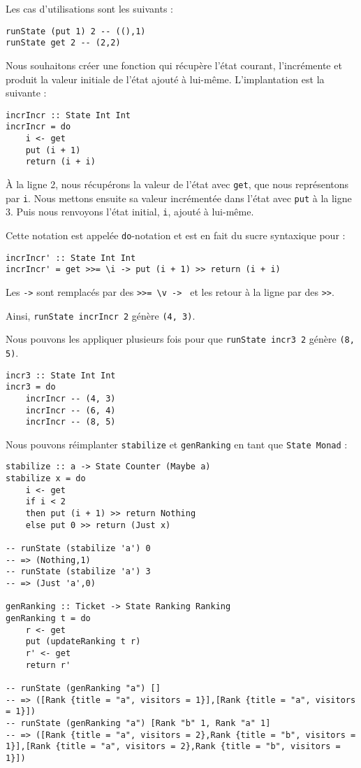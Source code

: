 \documentclass{llncs}
\begin{document}
Les cas d'utilisations sont les suivants :
\begin{lstlisting}
runState (put 1) 2 -- ((),1)
runState get 2 -- (2,2)
\end{lstlisting}

Nous souhaitons créer une fonction qui récupère l'état courant,
l'incrémente et produit la valeur initiale de l'état ajouté à lui-même.
L'implantation est la suivante :
\begin{lstlisting}
incrIncr :: State Int Int
incrIncr = do
    i <- get
    put (i + 1)
    return (i + i)
\end{lstlisting}
À la ligne 2, nous récupérons la valeur de l'état avec \lstinline{get}, que nous
représentons par \lstinline{i}.
Nous mettons ensuite sa valeur incrémentée dans l'état avec \lstinline{put} à la
ligne 3.
Puis nous renvoyons l'état initial, \lstinline{i}, ajouté à lui-même.

Cette notation est appelée \lstinline{do}-notation et est en fait du sucre syntaxique
pour :
\begin{lstlisting}
incrIncr' :: State Int Int
incrIncr' = get >>= \i -> put (i + 1) >> return (i + i)
\end{lstlisting}
Les \lstinline{->} sont remplacés par des \lstinline{>>= \v -> } et les retour à
la ligne par des \lstinline{>>}.

Ainsi, \lstinline{runState incrIncr 2} génère \lstinline{(4, 3)}.

Nous pouvons les appliquer plusieurs fois pour que \lstinline{runState incr3 2} génère \lstinline{(8, 5)}.
\begin{lstlisting}
incr3 :: State Int Int
incr3 = do
    incrIncr -- (4, 3)
    incrIncr -- (6, 4)
    incrIncr -- (8, 5)
\end{lstlisting}

Nous pouvons réimplanter \lstinline{stabilize} et \lstinline{genRanking} en tant
que \lstinline{State Monad} :
\begin{lstlisting}
stabilize :: a -> State Counter (Maybe a)
stabilize x = do
    i <- get
    if i < 2
    then put (i + 1) >> return Nothing
    else put 0 >> return (Just x)

-- runState (stabilize 'a') 0
-- => (Nothing,1)
-- runState (stabilize 'a') 3
-- => (Just 'a',0)

genRanking :: Ticket -> State Ranking Ranking
genRanking t = do
    r <- get
    put (updateRanking t r)
    r' <- get
    return r'

-- runState (genRanking "a") []
-- => ([Rank {title = "a", visitors = 1}],[Rank {title = "a", visitors = 1}])
-- runState (genRanking "a") [Rank "b" 1, Rank "a" 1] 
-- => ([Rank {title = "a", visitors = 2},Rank {title = "b", visitors = 1}],[Rank {title = "a", visitors = 2},Rank {title = "b", visitors = 1}])
\end{lstlisting}
\end{document}

